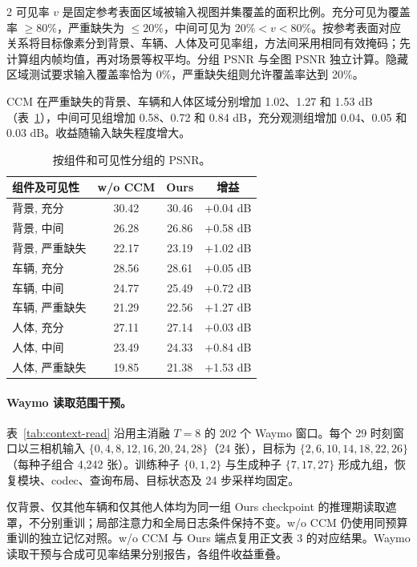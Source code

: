 \begin{multicols}{2}
可见率 $v$ 是固定参考表面区域被输入视图并集覆盖的面积比例。充分可见为覆盖率 $\geq80\%$，严重缺失为 $\leq20\%$，中间可见为 $20\%<v<80\%$。按参考表面对应关系将目标像素分到背景、车辆、人体及可见率组，方法间采用相同有效掩码；先计算组内帧均值，再对场景等权平均。分组 PSNR 与全图 PSNR 独立计算。隐藏区域测试要求输入覆盖率恰为 0\%，严重缺失组则允许覆盖率达到 20\%。

CCM 在严重缺失的背景、车辆和人体区域分别增加 1.02、1.27 和 1.53 dB（表~\ref{tab:visibility}），中间可见组增加 0.58、0.72 和 0.84 dB，充分观测组增加 0.04、0.05 和 0.03 dB。收益随输入缺失程度增大。

\begin{table}[H]
\centering\small
\setlength{\tabcolsep}{4pt}
\caption{按组件和可见性分组的 PSNR。}
\label{tab:visibility}
\begin{tabular}{@{}lccc@{}}
\toprule
组件及可见性 & w/o CCM & Ours & 增益 \\
\midrule
背景, 充分 & 30.42 & 30.46 & +0.04 dB \\
背景, 中间 & 26.28 & 26.86 & +0.58 dB \\
背景, 严重缺失 & 22.17 & 23.19 & +1.02 dB \\
车辆, 充分 & 28.56 & 28.61 & +0.05 dB \\
车辆, 中间 & 24.77 & 25.49 & +0.72 dB \\
车辆, 严重缺失 & 21.29 & 22.56 & +1.27 dB \\
人体, 充分 & 27.11 & 27.14 & +0.03 dB \\
人体, 中间 & 23.49 & 24.33 & +0.84 dB \\
人体, 严重缺失 & 19.85 & 21.38 & +1.53 dB \\
\bottomrule
\end{tabular}
\end{table}

\paragraph{Waymo 读取范围干预。}
表~\ref{tab:context-read} 沿用主消融 $T=8$ 的 202 个 Waymo 窗口。每个 29 时刻窗口以三相机输入 $\{0,4,8,12,16,20,24,28\}$（24 张），目标为 $\{2,6,10,14,18,22,26\}$（每种子组合 4,242 张）。训练种子 $\{0,1,2\}$ 与生成种子 $\{7,17,27\}$ 形成九组，恢复模块、codec、查询布局、目标状态及 24 步采样均固定。

仅背景、仅其他车辆和仅其他人体均为同一组 Ours checkpoint 的推理期读取遮罩，不分别重训；局部注意力和全局日志条件保持不变。w/o CCM 仍使用同预算重训的独立记忆对照。w/o CCM 与 Ours 端点复用正文表 3 的对应结果。Waymo 读取干预与合成可见率结果分别报告，各组件收益重叠。


\end{multicols}

